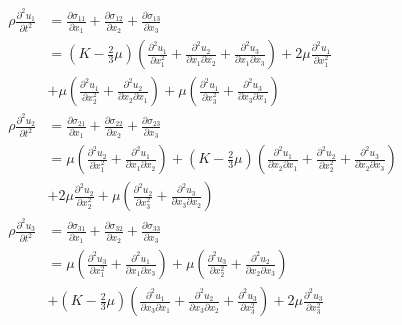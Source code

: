 \begin{align}
    \rho \frac{\partial^2{u_1}}{\partial{t^2}} &= \frac{\partial \sigma_{11}}{\partial x_1} + \frac{\partial \sigma_{12}}{\partial x_{2}} + \frac{\partial \sigma_{13}}{\partial x_{3}} \nonumber \\
    &= (K - \frac{2}{3}\mu)( \frac{\partial^2 u_1}{\partial x_1^2} + \frac{\partial^2 u_2}{\partial x_1 \partial x_2} + \frac{\partial^2 u_3}{\partial x_1 \partial x_3}) + 2\mu \frac{\partial^2u_1}{\partial x_1^2} \nonumber \\
        & + \mu(\frac{\partial^2 u_1}{\partial x_2^2} + \frac{\partial^2u_2}{\partial x_2 \partial x_1})
        + \mu(\frac{\partial^2 u_1}{\partial x_3^2} + \frac{\partial^2u_3}{\partial x_3 \partial x_1}) \\
    \rho \frac{\partial^2{u_2}}{\partial{t^2}} &= \frac{\partial \sigma_{21}}{\partial x_1} + \frac{\partial \sigma_{22}}{\partial x_{2}} + \frac{\partial \sigma_{23}}{\partial x_{3}} \nonumber \\
    &= \mu(\frac{\partial^2u_2}{\partial x_1^2} + \frac{\partial^2 u_1}{\partial x_1 \partial x_2})
    + (K - \frac{2}{3}\mu)( \frac{\partial^2 u_1}{\partial x_2 \partial x_1} + \frac{\partial^2 u_2}{\partial x_2^2} + \frac{\partial^2 u_3}{\partial x_2 \partial x_3}) \nonumber \\
    &+ 2\mu \frac{\partial^2u_2}{\partial x_2^2} 
    + \mu(\frac{\partial^2u_2}{\partial x_3^2} + \frac{\partial^2 u_3}{\partial x_3 \partial x_2}) \\
    \rho \frac{\partial^2{u_3}}{\partial{t^2}} & = \frac{\partial \sigma_{31}}{\partial x_1} + \frac{\partial \sigma_{32}}{\partial x_{2}} + \frac{\partial \sigma_{33}}{\partial x_{3}} \nonumber \\
    &= \mu(\frac{\partial^2u_3}{\partial x_1^2} + \frac{\partial^2 u_1}{\partial x_1 \partial x_3}) \nonumber
    + \mu(\frac{\partial^2 u_3}{\partial x_2^2} + \frac{\partial^2u_2}{\partial x_2 \partial x_3}) \\
    & + (K - \frac{2}{3}\mu)( \frac{\partial^2 u_1}{\partial x_3 \partial x_1}   + \frac{\partial^2 u_2}{\partial x_3 \partial x_2} + \frac{\partial^2 u_3}{\partial x_3^2}) + 2\mu \frac{\partial^2u_3}{\partial x_3^2} 
    \label{eqn:components}
\end{align}

